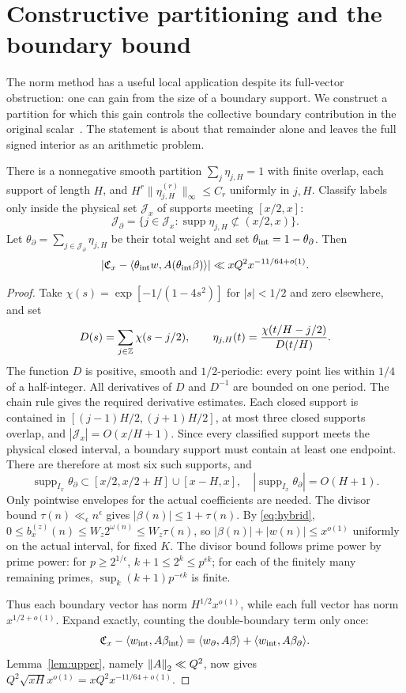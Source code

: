 \section{Constructive partitioning and the boundary bound}\label{sec:boundary}
The norm method has a useful local application despite its full-vector obstruction: one can gain from the size of a boundary support. We construct a partition for which this gain controls the collective boundary contribution in the original scalar~\cite{archivephysical}. The statement is about that remainder alone and leaves the full signed interior as an arithmetic problem.
\begin{theorem}\label{thm:boundary}
There is a nonnegative smooth partition $\sum_j\eta_{j,H}=1$ with finite overlap, each support of length $H$, and
$H^r\|\eta_{j,H}^{(r)}\|_\infty\le C_r$ uniformly in $j,H$.
Classify labels only inside the physical set $\mathcal J_x$ of supports meeting $[x/2,x]$:
\[
\mathcal J_\partial=\{j\in\mathcal J_x:\operatorname{supp}\eta_{j,H}\not\subset(x/2,x)\}.
\]
Let $\theta_\partial=\sum_{j\in\mathcal J_\partial}\eta_{j,H}$ be their total weight and set $\theta_{\rm int}=1-\theta_\partial$. Then
\[
\left|\mathfrak C_x-\langle \theta_{\rm int}w,A(\theta_{\rm int}\beta)\rangle\right|
\ll xQ^2x^{-11/64+o(1)}.
\]
\end{theorem}
\begin{proof}
Take $\chi(s)=\exp[-1/(1-4s^2)]$ for $|s|<1/2$ and zero elsewhere, and set
\[
D(s)=\sum_{j\in\mathbb Z}\chi(s-j/2),\qquad
\eta_{j,H}(t)=\frac{\chi(t/H-j/2)}{D(t/H)}.
\]
The function $D$ is positive, smooth and $1/2$-periodic: every point lies within $1/4$ of a half-integer. All derivatives of $D$ and $D^{-1}$ are bounded on one period. The chain rule gives the required derivative estimates.
Each closed support is contained in $[(j-1)H/2,(j+1)H/2]$, at most three closed supports overlap, and $|\mathcal J_x|=O(x/H+1)$.
Since every classified support meets the physical closed interval, a boundary support must contain at least one endpoint. There are therefore at most six such supports, and
\[
\operatorname{supp}_{I_x}\theta_\partial
\subset [x/2,x/2+H]\cup[x-H,x],
\quad |\operatorname{supp}_{I_x}\theta_\partial|=O(H+1).
\]
Only pointwise envelopes for the actual coefficients are needed. The divisor bound $\tau(n)\ll_\epsilon n^\epsilon$ gives $|\beta(n)|\le1+\tau(n)$.
By \eqref{eq:hybrid}, $0\le b_x^{(z)}(n)\le W_z2^{\omega(n)}\le W_z\tau(n)$, so
$|\beta(n)|+|w(n)|\le x^{o(1)}$ uniformly on the actual interval, for fixed $K$.
The divisor bound follows prime power by prime power: for $p\ge2^{1/\epsilon}$,
$k+1\le2^k\le p^{\epsilon k}$; for each of the finitely many remaining primes,
$\sup_k(k+1)p^{-\epsilon k}$ is finite.

Thus each boundary vector has norm $H^{1/2}x^{o(1)}$, while each full vector has norm $x^{1/2+o(1)}$.
Expand exactly, counting the double-boundary term only once:
\[
\mathfrak C_x-\langle w_{\rm int},A\beta_{\rm int}\rangle
=\langle w_\partial,A\beta\rangle+\langle w_{\rm int},A\beta_\partial\rangle.
\]
Lemma~\ref{lem:upper}, namely $\left\|A\right\|_2\ll Q^2$, now gives
$Q^2\sqrt{xH}x^{o(1)}=xQ^2x^{-11/64+o(1)}$.
\end{proof}
